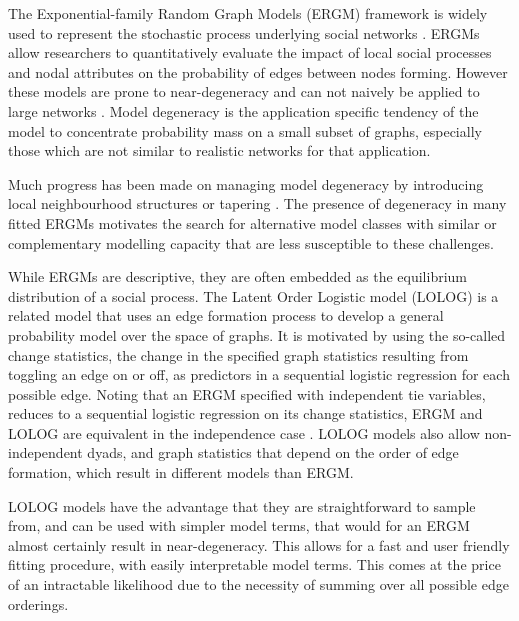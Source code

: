 \documentclass[
]{statsoc}
\begin{document}
The Exponential-family Random Graph Models (ERGM) framework is widely
used to represent the stochastic process underlying social networks
\citep{FrankStrauss1986,Hunter2006}. ERGMs allow researchers to
quantitatively evaluate the impact of local social processes and nodal
attributes on the probability of edges between nodes forming. However
these models are prone to near-degeneracy \citep{Handcock2003} and can
not naively be applied to large networks
\citep{schweinberger2011,chatterjee2013}. Model degeneracy is the
application specific tendency of the model to concentrate probability
mass on a small subset of graphs, especially those which are not similar
to realistic networks for that application.

Much progress has been made on managing model degeneracy by introducing
local neighbourhood structures \citep{schweinbergerhandcock2015} or
tapering \citep{fellowshandcock2017}. The presence of degeneracy in many
fitted ERGMs motivates the search for alternative model classes with
similar or complementary modelling capacity that are less susceptible to
these challenges.

While ERGMs are descriptive, they are often embedded as the equilibrium
distribution of a social process. The Latent Order Logistic model
(LOLOG) \citep{Fellows2018} is a related model that uses an edge
formation process to develop a general probability model over the space
of graphs. It is motivated by using the so-called change statistics, the
change in the specified graph statistics resulting from toggling an edge
on or off, as predictors in a sequential logistic regression for each
possible edge. Noting that an ERGM specified with independent tie
variables, reduces to a sequential logistic regression on its change
statistics, ERGM and LOLOG are equivalent in the independence case
\citep{Fellows2018}. LOLOG models also allow non-independent dyads, and
graph statistics that depend on the order of edge formation, which
result in different models than ERGM.

LOLOG models have the advantage that they are straightforward to sample
from, and can be used with simpler model terms, that would for an ERGM
almost certainly result in near-degeneracy. This allows for a fast and
user friendly fitting procedure, with easily interpretable model terms.
This comes at the price of an intractable likelihood due to the
necessity of summing over all possible edge orderings.
\end{document}
